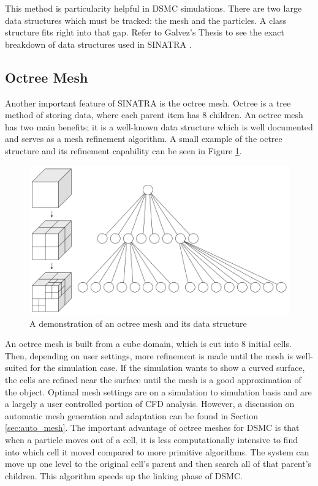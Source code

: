 \indent This method is particularity helpful in DSMC simulations. There are two large data structures which must be tracked: the mesh and the particles. A class structure fits right into that gap. Refer to Galvez's Thesis to see the exact breakdown of data structures used in SINATRA \cite{Galvez2018a}. \par

\subsection{Octree Mesh}
\label{sec:octree}

Another important feature of SINATRA is the octree mesh. Octree is a tree method of storing data, where each parent item has 8 children. An octree mesh has two main benefits; it is a well-known data structure which is well documented and serves as a mesh refinement algorithm. A small example of the octree structure and its refinement capability can be seen in Figure \ref{fig:octree}. \par


\begin{figure}
    \centering
    \includegraphics[width=.7\textwidth]{figures/octree.png}
    \caption[A demonstration of an octree mesh and its data structure]{A demonstration of an octree mesh and its data structure  \textmd{\cite{octree}}}
    \label{fig:octree}
\end{figure}


\indent An octree mesh is built from a cube domain, which is cut into 8 initial cells. Then, depending on user settings, more refinement is made until the mesh is well-suited for the simulation case. If the simulation wants to show a curved surface, the cells are refined near the surface until the mesh is a good approximation of the object. Optimal mesh settings are on a simulation to simulation basis and are a largely a user controlled portion of CFD analysis. However, a discussion on automatic mesh generation and adaptation can be found in Section \ref{sec:auto_mesh}. The important advantage of octree meshes for DSMC is that when a particle moves out of a cell, it is less computationally intensive to find into which cell it moved compared to more primitive algorithms. The system can move up one level to the original cell's parent and then search all of that parent's children. This algorithm speeds up the linking phase of DSMC. \par



